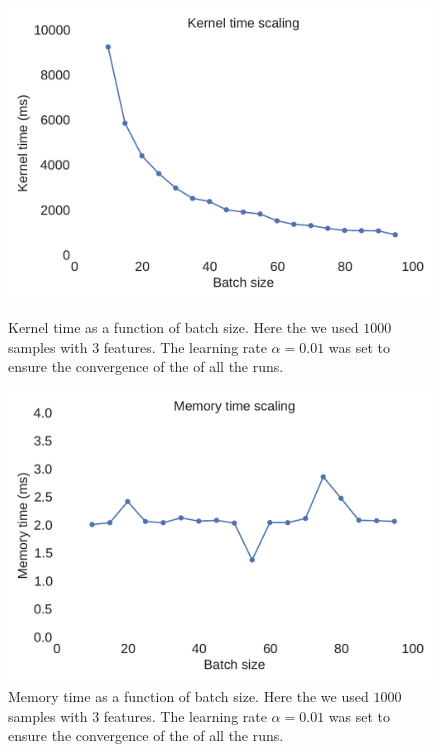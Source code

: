 \documentclass[11pt,a4paper]{article}
\begin{document}
\begin{figure}[H]
	\centering
  \includegraphics[width=\linewidth]{kernel_time_batch_scaling.pdf}
  \caption{Kernel time as a function of batch size. Here the we used $1000$ samples with $3$ features. The learning rate $\alpha=0.01$ was set to ensure the convergence of the of all the runs. }
  \label{fig:test_batch_size_kernel}
\endminipage
\hfill
{}
  \includegraphics[width=\linewidth]{memory_time_batch_scaling.pdf}
  \caption{Memory time as a function of batch size. Here the we used $1000$ samples with $3$ features. The learning rate $\alpha=0.01$ was set to ensure the convergence of the of all the runs.}
  \label{fig:test_batch_size_memory}
\endminipage
\end{figure}
\end{document}
